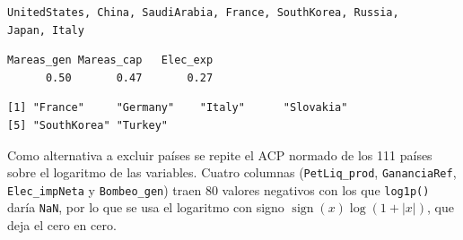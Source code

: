 \documentclass[oneside, openany, fontset=libertinus]{mitthesis}
\newenvironment{Shaded}{\begin{snugshade}}{\end{snugshade}}
\newcommand{\AttributeTok}[1]{\textcolor[rgb]{0.40,0.45,0.13}{#1}}
\newcommand{\ConstantTok}[1]{\textcolor[rgb]{0.56,0.35,0.01}{#1}}
\newcommand{\DecValTok}[1]{\textcolor[rgb]{0.68,0.00,0.00}{#1}}
\newcommand{\FunctionTok}[1]{\textcolor[rgb]{0.28,0.35,0.67}{#1}}
\newcommand{\NormalTok}[1]{\textcolor[rgb]{0.00,0.23,0.31}{#1}}
\newcommand{\OtherTok}[1]{\textcolor[rgb]{0.00,0.23,0.31}{#1}}
\newcommand{\SpecialCharTok}[1]{\textcolor[rgb]{0.37,0.37,0.37}{#1}}
\newcommand{\StringTok}[1]{\textcolor[rgb]{0.13,0.47,0.30}{#1}}
\begin{document}
\Needspace{0.76in}

\begin{Shaded}
\end{Shaded}

\begin{verbatim}
UnitedStates, China, SaudiArabia, France, SouthKorea, Russia,
Japan, Italy
\end{verbatim}

\Needspace{0.76in}

\begin{Shaded}
\end{Shaded}

\begin{verbatim}
Mareas_gen Mareas_cap   Elec_exp 
      0.50       0.47       0.27 
\end{verbatim}

\Needspace{0.57in}

\begin{Shaded}
\end{Shaded}

\begin{verbatim}
[1] "France"     "Germany"    "Italy"      "Slovakia"  
[5] "SouthKorea" "Turkey"    
\end{verbatim}

Como alternativa a excluir países se repite el ACP normado de los 111
países sobre el logaritmo de las variables. Cuatro columnas
(\texttt{PetLiq\_prod}, \texttt{GananciaRef}, \texttt{Elec\_impNeta} y
\texttt{Bombeo\_gen}) traen 80 valores negativos con los que
\texttt{log1p()} daría \texttt{NaN}, por lo que se usa el logaritmo con
signo \(\operatorname{sign}(x)\log(1 + |x|)\), que deja el cero en cero.
\end{document}
